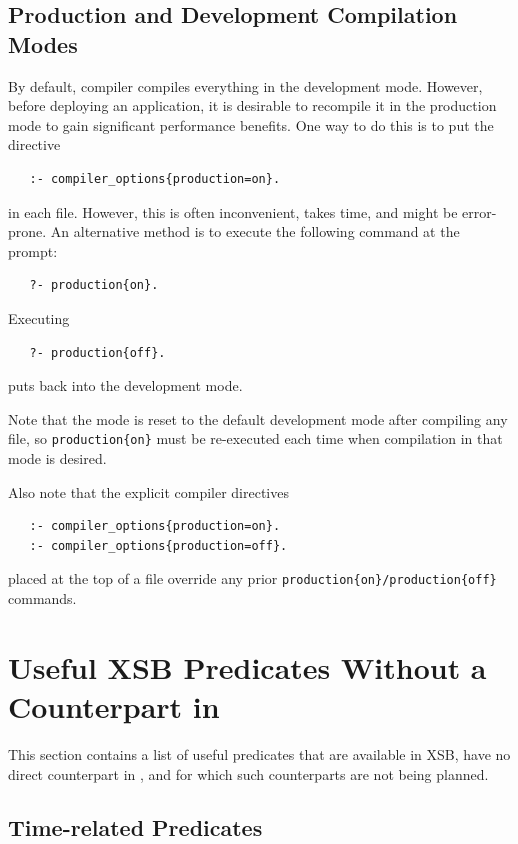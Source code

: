 \documentclass[11pt]{article}
\newcommand{\ERGO}{\mbox{\smaller{\ensuremath{\cal{E}}\smaller{{\sc{RGO}}}}}\xspace}
\newcommand{\FLSYSTEM}{\ERGO}
\begin{document}
\subsection{Production and Development Compilation  Modes}
\label{sec-production-shell}

By default, \FLSYSTEM compiler compiles everything in the development
mode. However, before deploying an application, it is desirable to
recompile it in the production mode to gain significant performance benefits.
One way to do this is to put the directive
\begin{verbatim}
   :- compiler_options{production=on}.
\end{verbatim}
in each file. However, this is often inconvenient, takes time, and might be
error-prone. An alternative method is to execute the following command at
the prompt:
\begin{verbatim}
   ?- production{on}.
\end{verbatim}
Executing
\begin{verbatim}
   ?- production{off}.
\end{verbatim}
puts \FLSYSTEM back into the development mode.

Note that the mode is reset to the default development mode after compiling
any file, so \texttt{production\{on\}} must be re-executed each time
when compilation in that mode is desired.

Also note that the explicit compiler directives
\begin{verbatim}
   :- compiler_options{production=on}.
   :- compiler_options{production=off}.
\end{verbatim}
placed at the top of a file override any prior
\texttt{production\{on\}/production\{off\}} commands. 
 

\section{Useful XSB Predicates Without a Counterpart in \FLSYSTEM}
\label{sec-useful-XSB-preds}

This section contains a list of useful predicates that are available in
XSB, have no direct counterpart in \FLSYSTEM, and for which such
counterparts are not being planned.

\subsection{Time-related Predicates}
\end{document}
